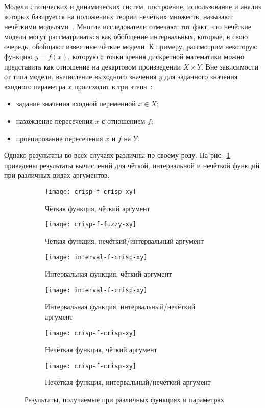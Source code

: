 Модели статических и динамических систем, построение, использование и анализ которых базируется на положениях теории нечётких множеств, называют нечёткими моделями~\cite{Borisov_Fedulov}. Многие исследователи отмечают тот факт, что нечёткие модели могут рассматриваться как обобщение интервальных, которые, в свою очередь, обобщают известные чёткие модели. К примеру, рассмотрим некоторую функцию $y=f \left(x \right)$, которую с точки зрения дискретной математики можно представить как отношение на декартовом произведении $X \times Y$. Вне зависимости от типа модели, вычисление выходного значения $y$ для заданного значения входного параметра $x$ происходит в три этапа~\cite{Borisov_Fedulov}:
\begin{itemize}
	\item задание значения входной переменной $x \in X$;
	\item нахождение пересечения $x$ с отношением $f$;
	\item проецирование пересечения $x$ и $f$ на $Y$.
\end{itemize}

Однако результаты во всех случаях различны по своему роду. На рис.~\ref{fig:functypes-restypes} приведены результаты вычислений для чёткой, интервальной и нечёткой функций при различных видах аргументов.

\begin{figure}[pH]
  \centering
  \begin{subfigure}[t]{0.4\textwidth}
    \texttt{[image: crisp-f-crisp-xy]}
    \caption{Чёткая функция, чёткий аргумент}
  \end{subfigure}
  \quad
  \begin{subfigure}[t]{0.4\textwidth}
    \texttt{[image: crisp-f-fuzzy-xy]}
    \caption{Чёткая функция, нечёткий/интервальный аргумент}
  \end{subfigure}
  
  \begin{subfigure}[h]{0.4\textwidth}
    \texttt{[image: interval-f-crisp-xy]}
    \caption{Интервальная функция, чёткий аргумент}
  \end{subfigure}
  \quad
  \begin{subfigure}[h]{0.4\textwidth}
    \texttt{[image: interval-f-crisp-xy]}
    \caption{Интервальная функция, интервальный/нечёткий аргумент}
  \end{subfigure}
  
  \begin{subfigure}[b]{0.4\textwidth}
    \texttt{[image: crisp-f-crisp-xy]}
    \caption{Нечёткая функция, чёткий аргумент}
  \end{subfigure}
  \quad
  \begin{subfigure}[b]{0.4\textwidth}
    \texttt{[image: crisp-f-crisp-xy]}
    \caption{Нечёткая функция, интервальный/нечёткий аргумент}
  \end{subfigure}
  \caption{Результаты, получаемые при различных функциях и параметрах}
  \label{fig:functypes-restypes}
\end{figure}

